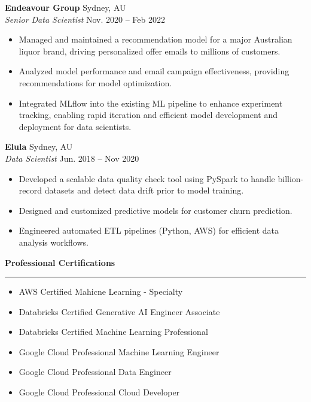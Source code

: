 \documentclass[a4paper,10pt]{article}
\begin{document}
\noindent
\textbf{Endeavour Group} \hfill Sydney, AU \\
\textit{Senior Data Scientist} \hfill Nov. 2020 – Feb 2022 \\
\begin{itemize}[leftmargin=0.15in, itemsep=1pt]
    \item Managed and maintained a recommendation model for a major Australian liquor brand, driving personalized offer emails to millions of customers.
    \item Analyzed model performance and email campaign effectiveness, providing recommendations for model optimization.
    \item Integrated MLflow into the existing ML pipeline to enhance experiment tracking, enabling rapid iteration and efficient model development and deployment for data scientists.
\end{itemize}

\vspace{0.5em}

\noindent
\textbf{Elula} \hfill Sydney, AU \\
\textit{Data Scientist} \hfill Jun. 2018 – Nov 2020 \\
\begin{itemize}[leftmargin=0.15in, itemsep=1pt]
    \item Developed a scalable data quality check tool using PySpark to handle billion-record datasets and detect data drift prior to model training.
    \item Designed and customized predictive models for customer churn prediction.
    \item Engineered automated ETL pipelines (Python, AWS) for efficient data analysis workflows.
\end{itemize}

\vspace{0.5em}

\begin{center}
    \textbf{\large Professional Certifications} \\
    \rule{\textwidth}{0.1pt}
\end{center}

\noindent
\begin{multicols}{2}
\begin{itemize}[leftmargin=0.15in, itemsep=1pt]
    \item AWS Certified Mahicne Learning - Specialty
    \item Databricks Certified Generative AI Engineer Associate
    \item Databricks Certified Machine Learning Professional
    \item Google Cloud Professional Machine Learning Engineer
    \item Google Cloud Professional Data Engineer
    \item Google Cloud Professional Cloud Developer
\end{itemize}
\end{multicols}
\end{document}
